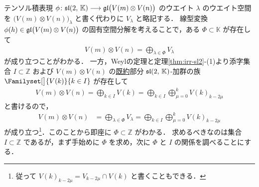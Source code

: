 \documentclass{ltjsarticle}
\theoremstyle{mystyle} %
\numberwithin{equation}{section}
\newcommand{\lto}{\longrightarrow}
\begin{document}
テンソル積表現 $\phi \colon \Lsl(2,\, \mathbb{K}) \lto \Lgl\bigl(V(m) \otimes V(n)\bigr)$ のウエイト $\lambda$ のウエイト空間を $\bigl(V(m) \otimes V(n)\bigr)_\lambda$ と書く代わりに $V_\lambda$ と略記する．
線型変換 $\phi(h) \in \mathfrak{gl}\bigl(V(m) \otimes V(n)\bigr)$ の固有空間分解を考えることで，ある $\Phi \subset \mathbb{K}$ が存在して
\begin{align}
    V(m) \otimes V(n) = \bigoplus_{\lambda \in \Phi} V_\lambda
\end{align}
が成り立つことがわかる．
一方，Weylの定理と定理\ref{thm:irr-sl2}-(1)より添字集合 $I \subset \bm{\mathbb{Z}}$ および $V(m) \otimes V(n)$ の\underline{既約}部分 $\mathfrak{sl}(2,\, \mathbb{K})$-加群の族 $\Familyset[\big]{V(k)}{k \in I}$ が存在して
\begin{align}
    V(m) \otimes V(n) = \bigoplus_{k \in I} V(k) = \bigoplus_{k \in I} \bigoplus_{\mu = 0}^{k} V(k)_{k - 2\mu}
\end{align}
と書けるので，
\begin{align}
    \label{eq:sl2-Weyl}
    V(m) \otimes V(n) &= \bigoplus_{\lambda \in \Phi} V_\lambda
    =  \bigoplus_{k \in I} \bigoplus_{\mu = 0}^{k} V(k)_{k - 2\mu}
\end{align}
が成り立つ\footnote{従って $V(k)_{k-2\mu} = V_{k-2\mu} \cap V(k)$ と書くこともできる．}．このことから即座に $\Phi \subset \mathbb{Z}$ がわかる．
求めるべきなのは集合 $I \subset \mathbb{Z}$ であるが，まず手始めに $\Phi$ を求め，次に $\Phi$ と $I$ の関係を調べることにする．


\end{document}
